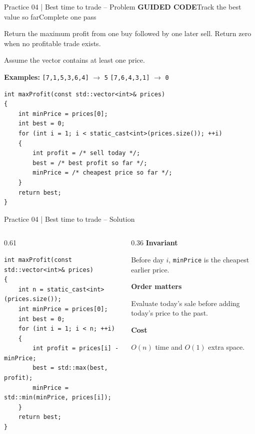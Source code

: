 \documentclass[10pt,aspectratio=169]{beamer}
\newcommand{\problemmeta}[2]{%
 {\color{BootcampBlue}\small\textbf{GUIDED CODE}\quad #1\hfill #2}\par\smallskip\small}
\newcommand{\explain}[2]{%
 {\color{BootcampBlueDark}\textbf{#1}}\par #2\par\medskip}
\begin{document}
\begin{frame}[fragile]{Practice 04 | Best time to trade -- Problem}
\problemmeta{Track the best value so far}{Complete one pass}
Return the maximum profit from one buy followed by one later sell. Return zero when no profitable trade exists.
{\small Assume the vector contains at least one price.\par}
\smallskip\par
\textbf{Examples:} \texttt{[7,1,5,3,6,4]} $\to$ \texttt{5}\qquad
\texttt{[7,6,4,3,1]} $\to$ \texttt{0}
\begin{lstlisting}[style=tinycpp]
int maxProfit(const std::vector<int>& prices)
{
    int minPrice = prices[0];
    int best = 0;
    for (int i = 1; i < static_cast<int>(prices.size()); ++i)
    {
        int profit = /* sell today */;
        best = /* best profit so far */;
        minPrice = /* cheapest price so far */;
    }
    return best;
}
\end{lstlisting}
\end{frame}

\begin{frame}[fragile]{Practice 04 | Best time to trade -- Solution}
\begin{columns}[T,onlytextwidth]
\begin{column}{0.61\textwidth}
\begin{lstlisting}[style=solutioncpp]
int maxProfit(const std::vector<int>& prices)
{
    int n = static_cast<int>(prices.size());
    int minPrice = prices[0];
    int best = 0;
    for (int i = 1; i < n; ++i)
    {
        int profit = prices[i] - minPrice;
        best = std::max(best, profit);
        minPrice = std::min(minPrice, prices[i]);
    }
    return best;
}
\end{lstlisting}
\end{column}
\begin{column}{0.36\textwidth}
\small
\explain{Invariant}{Before day $i$, \texttt{minPrice} is the cheapest earlier price.}
\explain{Order matters}{Evaluate today's sale before adding today's price to the past.}
\explain{Cost}{$O(n)$ time and $O(1)$ extra space.}
\end{column}
\end{columns}
\end{frame}
\end{document}
